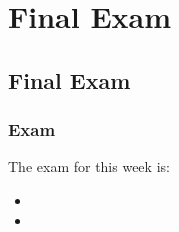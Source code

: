 \clearpage

\renewcommand{\ChapTitle}{Final Exam}
\renewcommand{\SectionTitle}{Final Exam}

\chapter{\ChapTitle}
\section{\SectionTitle}

\subsection{Exam}

The exam for this week is:

\begin{itemize}
    \item {}
    \item {}
\end{itemize}